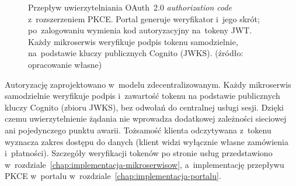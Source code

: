 \begin{figure}[H]
    \centering
    \caption{Przepływ uwierzytelniania OAuth~2.0 \emph{authorization code} z~rozszerzeniem PKCE. Portal generuje weryfikator i~jego skrót; po~zalogowaniu wymienia kod autoryzacyjny na~tokeny JWT. Każdy mikroserwis weryfikuje podpis tokenu samodzielnie, na~podstawie kluczy publicznych Cognito (JWKS). (źródło: opracowanie własne)}
    \label{fig:pkce}
\end{figure}

Autoryzację zaprojektowano w~modelu zdecentralizowanym. Każdy mikroserwis samodzielnie weryfikuje podpis
i~zawartość tokenu na podstawie publicznych kluczy Cognito (zbioru JWKS), bez odwołań do centralnej usługi sesji.
Dzięki czemu uwierzytelnienie żądania nie wprowadza dodatkowej zależności sieciowej ani pojedynczego punktu
awarii. Tożsamość klienta odczytywana z~tokenu wyznacza zakres dostępu do danych (klient widzi wyłącznie własne
zamówienia i~płatności). Szczegóły weryfikacji tokenów po stronie usług przedstawiono w~rozdziale~\ref{chap:implementacja-mikroserwisow}, 
a~implementację przepływu PKCE w~portalu w~rozdziale~\ref{chap:implementacja-portalu}.